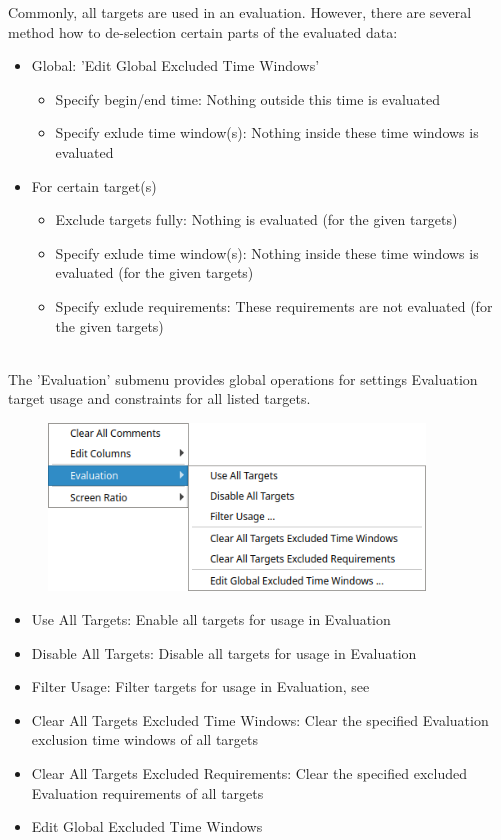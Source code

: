 Commonly, all targets are used in an evaluation. However, there are several method how to de-selection certain parts of the evaluated data:
\begin{itemize}
  \item Global: 'Edit Global Excluded Time Windows'
\begin{itemize}
  \item Specify begin/end time: Nothing outside this time is evaluated
  \item Specify exlude time window(s): Nothing inside these time windows is evaluated
 \end{itemize}   
  \item For certain target(s)
\begin{itemize}
  \item Exclude targets fully: Nothing is evaluated (for the given targets)
  \item Specify exlude time window(s): Nothing inside these time windows is evaluated (for the given targets)
  \item Specify exlude requirements: These requirements are not evaluated (for the given targets)
 \end{itemize}   
 \end{itemize} 
 \  \\

The 'Evaluation' submenu provides global operations for settings Evaluation target usage and constraints for all listed targets.

\begin{figure}[H]
  \center
  \includegraphics[width=10cm,frame]{figures/ui_targets_config_eval.png}
\end{figure}

\begin{itemize}
  \item Use All Targets: Enable all targets for usage in Evaluation
  \item Disable All Targets: Disable all targets for usage in Evaluation
  \item Filter Usage: Filter targets for usage in Evaluation, see 
  \item Clear All Targets Excluded Time Windows: Clear the specified Evaluation exclusion time windows of all targets
  \item Clear All Targets Excluded Requirements: Clear the specified excluded Evaluation requirements of all targets
  \item Edit Global Excluded Time Windows
\end{itemize} 
\ \\

